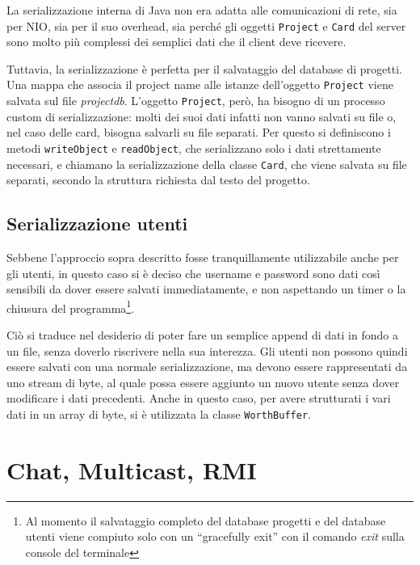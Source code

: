 \documentclass[a4paper,11pt] {article}
\begin{document}
La serializzazione interna di Java non era adatta alle comunicazioni di rete, sia per NIO, sia per il suo overhead, sia perché gli oggetti \texttt{Project} e \texttt{Card} del server sono molto più complessi dei semplici dati che il client deve ricevere.

Tuttavia, la serializzazione è perfetta per il salvataggio del database di progetti. Una mappa che associa il project name alle istanze dell'oggetto \texttt{Project} viene salvata sul file \textit{projectdb}. L'oggetto \texttt{Project}, però, ha bisogno di un processo custom di serializzazione: molti dei suoi dati infatti non vanno salvati su file o, nel caso delle card, bisogna salvarli su file separati. Per questo si definiscono i metodi \texttt{writeObject} e \texttt{readObject}, che serializzano solo i dati strettamente necessari, e chiamano la serializzazione della classe \texttt{Card}, che viene salvata su file separati, secondo la struttura richiesta dal testo del progetto.

\subsection*{Serializzazione utenti}

Sebbene l'approccio sopra descritto fosse tranquillamente utilizzabile anche per gli utenti, in questo caso si è deciso che username e password sono dati così sensibili da dover essere salvati immediatamente, e non aspettando un timer o la chiusura del programma\footnote{Al momento il salvataggio completo del database progetti e del database utenti viene compiuto solo con un ``gracefully exit'' con il comando \textit{exit} sulla console del terminale}.

Ciò si traduce nel desiderio di poter fare un semplice append di dati in fondo a un file, senza doverlo riscrivere nella sua interezza. Gli utenti non possono quindi essere salvati con una normale serializzazione, ma devono essere rappresentati da uno stream di byte, al quale possa essere aggiunto un nuovo utente senza dover modificare i dati precedenti. Anche in questo caso, per avere strutturati i vari dati in un array di byte, si è utilizzata la classe \texttt{WorthBuffer}.

\section*{Chat, Multicast, RMI}
\end{document}
